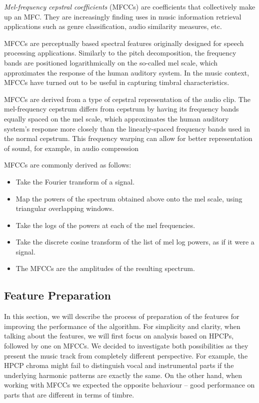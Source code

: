 \textit{Mel-frequency cepstral coefficients} (MFCCs) are coefficients that collectively make up an MFC. They are increasingly finding uses in music information retrieval applications such as genre classification, audio similarity measures, etc.

MFCCs are perceptually based spectral features originally designed for speech processing applications. Similarly to the pitch decomposition, the frequency bands are positioned logarithmically on the so-called mel scale, which approximates the response of the human auditory system. In the music context, MFCCs have turned out to be useful in capturing timbral characteristics.

MFCCs are derived from a type of cepstral representation of the audio clip. The mel-frequency cepstrum differs from cepstrum by having its frequency bands equally spaced on the mel scale, which approximates the human auditory system's response more closely than the linearly-spaced frequency bands used in the normal cepstrum. This frequency warping can allow for better representation of sound, for example, in audio compression~\cite{mfcc}

MFCCs are commonly derived as follows:
\begin{itemize}
\item Take the Fourier transform of a signal.
\item Map the powers of the spectrum obtained above onto the mel scale, using triangular overlapping windows.
\item Take the logs of the powers at each of the mel frequencies.
\item Take the discrete cosine transform of the list of mel log powers, as if it were a signal.
\item The MFCCs are the amplitudes of the resulting spectrum.
\end{itemize}

\vspace{10pt}

\subsection{Feature Preparation}

In this section, we will describe the process of preparation of the features for improving the performance of the algorithm. For simplicity and clarity, when talking about the features, we will first focus on analysis based on HPCPs, followed by one on MFCCs.
We decided to investigate both possibilities as they present the music track from completely different perspective. For example, the HPCP chroma might fail to distinguish vocal and instrumental parts if the underlying harmonic patterns are exactly the same. On the other hand, when working with MFCCs we expected the opposite behaviour -- good performance on parts that are different in terms of timbre.

